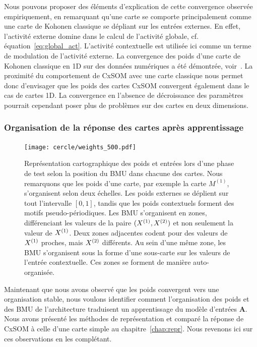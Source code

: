 \documentclass[../main]{subfiles}
\begin{document}
Nous pouvons proposer des éléments d'explication de cette convergence observée empiriquement, en remarquant qu'une carte se comporte principalement comme une carte de Kohonen classique se dépliant sur les entrées externes. En effet, l'activité externe domine dans le calcul de l'activité globale, cf. équation~\ref{eq:global_act}.
L'activité contextuelle est utilisée ici comme un terme de modulation de l'activité externe.
La convergence des poids d'une carte de Kohonen classique en 1D sur des données numériques a été démontrée, voir~\cite{Cottrell1998TheoreticalAO}. 
La proximité du comportement de CxSOM avec une carte classique nous permet donc d'envisager que les poids des cartes CxSOM convergent également dans le cas de cartes 1D.
La convergence en l'absence de décroissance des paramètres pourrait cependant poser plus de problèmes sur des cartes en deux dimensions.

\subsubsection{Organisation de la réponse des cartes après apprentissage}

\begin{figure}
	\centering\texttt{[image: cercle/weights\_500.pdf]}
	\caption{Représentation cartographique des poids et entrées lors d'une phase de test selon la position du BMU dans chacune des cartes. Nous remarquons que les poids d'une carte, par exemple la carte $M^{(1)}$, s'organisent selon deux échelles. Les poids externes se déplient sur tout l'intervalle $[0,1]$, tandis que les poids contextuels forment des motifs pseudo-périodiques. 
	Les BMU s'organisent en zones, différenciant les valeurs de la paire $(X^{({1})}, X^{({2})})$ et non seulement la valeur de $X^{({1})}$. 
	Deux zones adjacentes codent pour des valeurs de $X^{({1})}$ proches, mais $X^{({2})}$ différents. 
	Au sein d'une même zone, les BMU s'organisent sous la forme d'une sous-carte sur les valeurs de l'entrée contextuelle. Ces zones se forment de manière auto-organisée. \label{fig:w}}
\end{figure}

Maintenant que nous avons observé que les poids convergent vers une organisation stable, nous voulons identifier comment l'organisation des poids et des BMU de l'architecture traduisent un apprentissage du modèle d'entrées \textbf{A}.
Nous avons présenté les méthodes de représentation et comparé la réponse de CxSOM à celle d'une carte simple au chapitre~\ref{chap:repr}. Nous revenons ici sur ces observations en les complétant.
\end{document}
